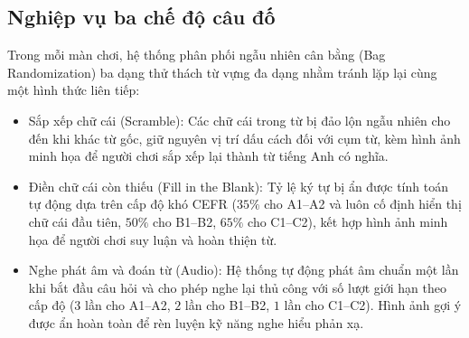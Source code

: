 \subsection{Nghiệp vụ ba chế độ câu đố}
\label{subsec:puzzle_modes}
Trong mỗi màn chơi, hệ thống phân phối ngẫu nhiên cân bằng (Bag Randomization) ba dạng thử thách từ vựng đa dạng nhằm tránh lặp lại cùng một hình thức liên tiếp:
\begin{itemize}
    \item Sắp xếp chữ cái (Scramble): Các chữ cái trong từ bị đảo lộn ngẫu nhiên cho đến khi khác từ gốc, giữ nguyên vị trí dấu cách đối với cụm từ, kèm hình ảnh minh họa để người chơi sắp xếp lại thành từ tiếng Anh có nghĩa.
    \item Điền chữ cái còn thiếu (Fill in the Blank): Tỷ lệ ký tự bị ẩn được tính toán tự động dựa trên cấp độ khó CEFR ($35\%$ cho A1--A2 và luôn cố định hiển thị chữ cái đầu tiên, $50\%$ cho B1--B2, $65\%$ cho C1--C2), kết hợp hình ảnh minh họa để người chơi suy luận và hoàn thiện từ.
    \item Nghe phát âm và đoán từ (Audio): Hệ thống tự động phát âm chuẩn một lần khi bắt đầu câu hỏi và cho phép nghe lại thủ công với số lượt giới hạn theo cấp độ ($3$ lần cho A1--A2, $2$ lần cho B1--B2, $1$ lần cho C1--C2). Hình ảnh gợi ý được ẩn hoàn toàn để rèn luyện kỹ năng nghe hiểu phản xạ.
\end{itemize}

